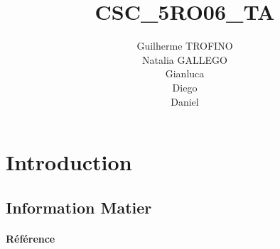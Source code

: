 \documentclass{article}
\title{CSC\_5RO06\_TA}
\author{Guilherme TROFINO\\Natalia GALLEGO\\Gianluca\\Diego\\Daniel}
\begin{document}
\maketitle

\newpage\tableofcontents

\section{Introduction}
\subsection{Information Matier}
\paragraph{Référence}






\end{document}
